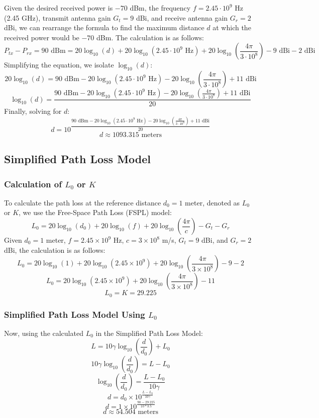 \documentclass[11pt]{article}
\begin{document}
Given the desired received power is \(-70\) dBm, the frequency \(f = 2.45 \cdot 10^9\) Hz (2.45 GHz), transmit antenna gain \(G_{t} = 9\) dBi, and receive antenna gain \(G_{r} = 2\) dBi, we can rearrange the formula to find the maximum distance \(d\) at which the received power would be \(-70\) dBm. The calculation is as follows:
\[
P_{tx}-P_{rx} = 90 \text{ dBm} = 20 \log_{10}(d) + 20 \log_{10}(2.45 \cdot 10^9 \text{ Hz}) + 20 \log_{10}\left(\frac{4\pi}{3\cdot 10^8}\right) - 9 \text{ dBi} - 2 \text{ dBi}
\]
Simplifying the equation, we isolate \( \log_{10}(d) \):
\[
20 \log_{10}(d) = 90 \text{ dBm} - 20 \log_{10}(2.45 \cdot 10^9 \text{ Hz}) - 20 \log_{10}\left(\frac{4\pi}{3\cdot 10^8}\right) + 11 \text{ dBi}
\]
\[
\log_{10}(d) = \frac{90 \text{ dBm} - 20 \log_{10}(2.45 \cdot 10^9 \text{ Hz}) - 20 \log_{10}\left(\frac{4\pi}{3\cdot 10^8}\right) + 11 \text{ dBi}}{20}
\]
Finally, solving for \(d\):
\[
d = 10^{\dfrac{90 \text{ dBm} - 20 \log_{10}(2.45 \cdot 10^9 \text{ Hz}) - 20 \log_{10}\left(\frac{4\pi}{3 \cdot 10^8}\right) + 11 \text{ dBi}}{20}}
\]
\[
d \approx 1093.315 \text{ meters}
\]

\subsection*{Simplified Path Loss Model}
\subsubsection*{Calculation of \( L_0 \) or \( K \)}
To calculate the path loss at the reference distance \( d_0 = 1 \) meter, denoted as \( L_0 \) or \( K \), we use the Free-Space Path Loss (FSPL) model:
\[
L_0 = 20 \log_{10}(d_0) + 20 \log_{10}(f) + 20 \log_{10}\left(\frac{4\pi}{c}\right) - G_{t} - G_{r}
\]
Given \( d_0 = 1 \) meter, \( f = 2.45 \times 10^9 \) Hz, \( c = 3 \times 10^8 \) m/s, \( G_{t} = 9 \) dBi, and \( G_{r} = 2 \) dBi, the calculation is as follows:
\[
L_0 = 20 \log_{10}(1) + 20 \log_{10}(2.45 \times 10^9) + 20 \log_{10}\left(\frac{4\pi}{3 \times 10^8}\right) - 9 - 2
\]
\[
L_0 = 20 \log_{10}(2.45 \times 10^9) + 20 \log_{10}\left(\frac{4\pi}{3 \times 10^8}\right) - 11
\]
\[
L_0 = K = 29.225
\]

\subsubsection*{Simplified Path Loss Model Using \( L_0 \)}
Now, using the calculated \( L_0 \) in the Simplified Path Loss Model:
\[
L = 10 \gamma \log_{10}\left(\frac{d}{d_{0}}\right) + L_0
\]
\[
10 \gamma \log_{10}\left(\frac{d}{d_{0}}\right) = L - L_0
\]
\[
\log_{10}\left(\frac{d}{d_{0}}\right) = \frac{L - L_0}{10 \gamma}
\]
\[
d = d_{0} \times 10^{\frac{L - L_0}{10 \gamma}}
\]
\[
d = 1 \times 10^{\frac{90 - 29.225}{10*3.5}}
\]
\[
d \approx 54.504 \text{ meters}
\]
\end{document}
